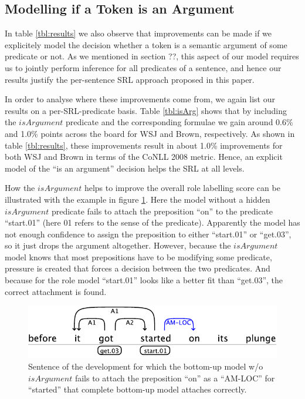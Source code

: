 \subsection{Modelling if a Token is an Argument}
In table \ref{tbl:results} we also observe that improvements can be made if we explicitely model the decision whether a token is a semantic argument of some predicate or not. As we mentioned in section ??, this aspect of our model requires us to jointly perform inference for all predicates of a sentence, and hence our results justify the per-sentence SRL approach proposed in this paper.

In order to analyse where these improvements come from, we again list our results on a per-SRL-predicate basis. Table \ref{tbl:isArg} shows that by including the $isArgument$ predicate and the corresponding formulae we gain around 0.6\% and 1.0\% points across the board for WSJ and Brown, respectively. As shown in table \ref{tbl:results}, these improvements result in about 1.0\% improvements for both WSJ and Brown in terms of the CoNLL 2008 metric. Hence, an explicit model of the ``is an argument'' decision helps the SRL at all levels. 

How the $isArgument$ helps to improve the overall role labelling score can be illustrated with the example in figure \ref{fig:isArg}. Here the model without a hidden $isArgument$ predicate fails to attach the preposition ``on'' to the predicate ``start.01'' (here 01 refers to the sense of the predicate). Apparently the model has not enough confidence to assign the preposition to either ``start.01'' or ``get.03'', so it just drops the argument altogether. However, because the $isArgument$ model knows that most prepositions have to be modifying some predicate, pressure is created that forces a decision between the two predicates. And because for the role model ``start.01'' looks like a better fit than ``get.03'', the correct attachment is found.

\begin{figure}
\begin{center}
    \includegraphics[scale=.62]{is-arg-example}
\end{center}
\caption{Sentence of the development for which the bottom-up model w/o $isArgument$ fails to attach the preposition ``on'' as a ``AM-LOC'' for ``started'' that complete bottom-up model attaches correctly.   }
\label{fig:isArg}
\end{figure}


